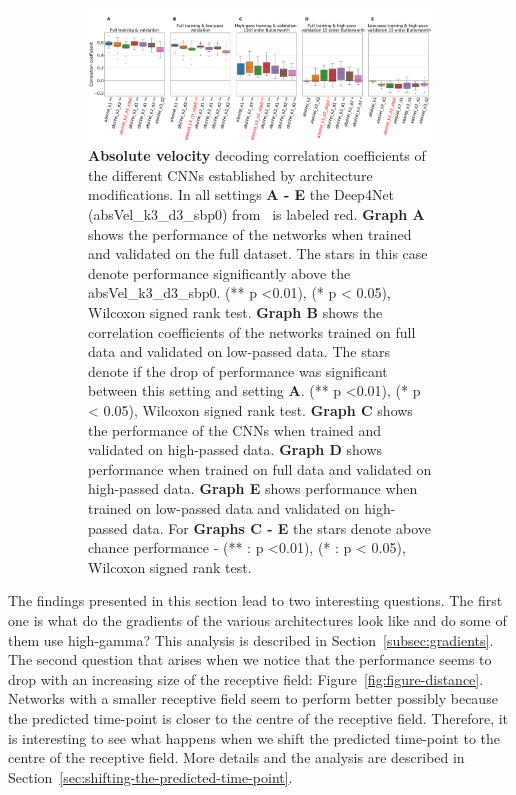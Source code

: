 \begin{itemize}
\begin{figure}
\begin{subfigure}[b]{\textwidth}
   \includegraphics[width=1\linewidth]{img/ch4/original_setting_absVel_performance_comparison}
   \caption{\textbf{Absolute velocity} decoding correlation coefficients of the different CNNs established by architecture modifications. In all settings \textbf{
   A - E} the Deep4Net (absVel\_k3\_d3\_sbp0) from~\cite{Hammer-2021} is labeled red. \textbf{Graph A} shows the performance of the networks when trained and validated on the full dataset. The stars in this case denote performance significantly above the absVel\_k3\_d3\_sbp0. (** p <0.01), (* p < 0.05), Wilcoxon signed rank test.
   \textbf{Graph B} shows the correlation coefficients of the networks trained on full data and validated on low-passed data. 
   The stars denote if the drop of performance was significant between this setting and setting \textbf{A}. (** p <0.01), (* p < 0.05), Wilcoxon signed rank test.
   \textbf{Graph C} shows the performance of the CNNs when trained and validated on high-passed data. \textbf{Graph D} shows performance when trained on full data and validated on high-passed data. \textbf{Graph E} shows performance when trained on low-passed data and validated on high-passed data. For \textbf{Graphs C - E} the stars denote above chance performance - (** : p <0.01), (* : p < 0.05), Wilcoxon signed rank test.}
   \label{fig:original-performances-absolute-velocity}
\end{subfigure}
\caption[Non-shifted causal prediction - performances ]{}
\label{fig:original-performances}
\end{figure}


\end{itemize}

The findings presented in this section lead to two interesting questions.
The first one  is what do the gradients of the various architectures look like and do some of them use high-gamma?
This analysis is described in Section~\ref{subsec:gradients}.
The second question that arises when we notice that the performance seems to drop with an increasing size of the receptive field: Figure~\ref{fig:figure-distance}.
Networks with a smaller receptive field seem to perform better possibly because the predicted time-point is closer to the centre of the receptive field.
Therefore, it is interesting to see what happens when we shift the predicted time-point to the centre of the receptive field.
More details and the analysis are described in Section~\ref{sec:shifting-the-predicted-time-point}.

